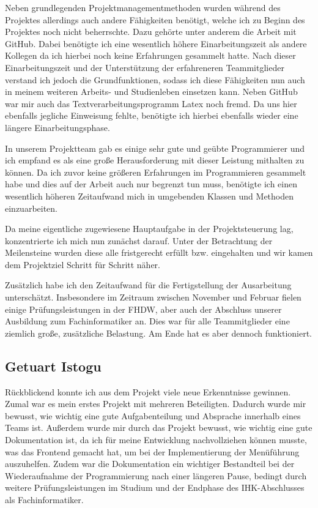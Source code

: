 Neben grundlegenden Projektmanagementmethoden wurden während des Projektes allerdings auch andere Fähigkeiten benötigt, welche ich zu Beginn des Projektes noch nicht beherrschte. Dazu gehörte unter anderem die Arbeit mit GitHub. Dabei benötigte ich eine wesentlich höhere Einarbeitungszeit als andere Kollegen da ich hierbei noch keine Erfahrungen gesammelt hatte. Nach dieser Einarbeitungszeit und der Unterstützung der erfahreneren Teammitglieder verstand ich jedoch die Grundfunktionen, sodass ich diese Fähigkeiten nun auch in meinem weiteren Arbeits- und Studienleben einsetzen kann. 
Neben GitHub war mir auch das Textverarbeitungsprogramm Latex noch fremd. Da uns hier ebenfalls jegliche Einweisung fehlte, benötigte ich hierbei ebenfalls wieder eine längere Einarbeitungsphase.

In unserem Projektteam gab es einige sehr gute und geübte Programmierer und ich empfand es als eine große Herausforderung mit dieser Leistung mithalten zu können. Da ich zuvor keine größeren Erfahrungen im Programmieren gesammelt habe und dies auf der Arbeit auch nur begrenzt tun muss, benötigte ich einen wesentlich höheren Zeitaufwand mich in umgebenden Klassen und Methoden einzuarbeiten.

Da meine eigentliche zugewiesene Hauptaufgabe in der Projektsteuerung lag, konzentrierte ich mich nun zunächst darauf. Unter der Betrachtung der Meilensteine wurden diese alle fristgerecht erfüllt bzw. eingehalten und wir kamen dem Projektziel Schritt für Schritt näher.

Zusätzlich habe ich den Zeitaufwand für die Fertigstellung der Ausarbeitung unterschätzt. Insbesondere im Zeitraum zwischen November und Februar fielen einige Prüfungsleistungen in der FHDW, aber auch der Abschluss unserer Ausbildung zum Fachinformatiker an. Dies war für alle Teammitglieder eine ziemlich große, zusätzliche Belastung. Am Ende hat es aber dennoch funktioniert.


\subsection{Getuart Istogu}
Rückblickend konnte ich aus dem Projekt viele neue Erkenntnisse gewinnen. Zumal war es mein erstes Projekt mit mehreren Beteiligten. Dadurch wurde mir bewusst, wie wichtig eine gute Aufgabenteilung und Absprache innerhalb eines Teams ist. Außerdem wurde mir durch das Projekt bewusst, wie wichtig eine gute Dokumentation ist, da ich für meine Entwicklung nachvollziehen können musste, was das Frontend gemacht hat, um bei der Implementierung der Menüführung auszuhelfen. Zudem war die Dokumentation ein wichtiger Bestandteil bei der Wiederaufnahme der Programmierung nach einer längeren Pause, bedingt durch weitere Prüfungsleistungen im Studium und der Endphase des IHK-Abschlusses als Fachinformatiker.

